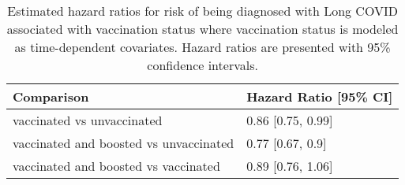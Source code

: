 \begin{table}[!htbp]
\centering
\begin{tabular}{ll}
  \hline
Comparison & Hazard Ratio [95\% CI] \\ 
  \hline
vaccinated vs unvaccinated & 0.86 [0.75, 0.99] \\ 
  vaccinated and boosted vs unvaccinated & 0.77 [0.67, 0.9] \\ 
  vaccinated and boosted vs vaccinated & 0.89 [0.76, 1.06] \\ 
   \hline
\end{tabular}
\caption{Estimated hazard ratios for risk of being diagnosed with Long COVID associated with vaccination status where vaccination status is modeled as time-dependent covariates. Hazard ratios are presented with 95\% confidence intervals.} 
\label{tab:cox_time_dep_nozero_alt_emm_pairs}
\end{table}
